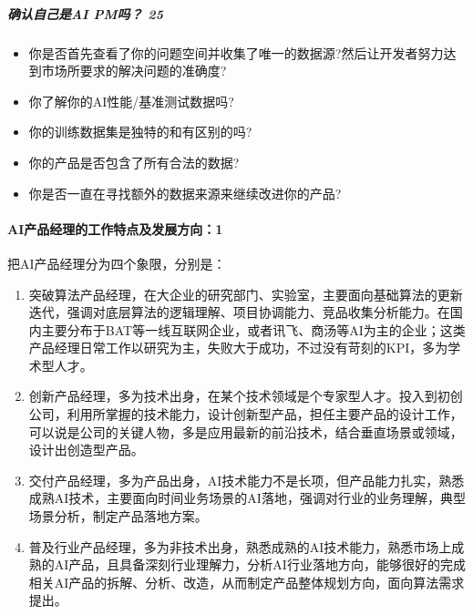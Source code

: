\documentclass[letterpaper,11pt,english]{sphinxmanual}
\begin{document}
\subparagraph{确认自己是AI PM吗？ 25\sphinxfootnotemark[82]}
\label{\detokenize{chapter_introduction/AI_PM:ai-pm-25}}%
\begin{footnotetext}[82]\sphinxAtStartFootnote
{}
%
\end{footnotetext}\ignorespaces \begin{itemize}
\item {} 
你是否首先查看了你的问题空间并收集了唯一的数据源?然后让开发者努力达到市场所要求的解决问题的准确度?

\item {} 
你了解你的AI性能/基准测试数据吗?

\item {} 
你的训练数据集是独特的和有区别的吗?

\item {} 
你的产品是否包含了所有合法的数据?

\item {} 
你是否一直在寻找额外的数据来源来继续改进你的产品?

\end{itemize}


\paragraph{AI产品经理的工作特点及发展方向：1\sphinxfootnotemark[83]}
\label{\detokenize{chapter_introduction/AI_PM:ai-1}}%
\begin{footnotetext}[83]\sphinxAtStartFootnote
{}
%
\end{footnotetext}\ignorespaces 
把AI产品经理分为四个象限，分别是：
\begin{enumerate}
%
\item {} 
突破算法产品经理，在大企业的研究部门、实验室，主要面向基础算法的更新迭代，强调对底层算法的逻辑理解、项目协调能力、竞品收集分析能力。在国内主要分布于BAT等一线互联网企业，或者讯飞、商汤等AI为主的企业；这类产品经理日常工作以研究为主，失败大于成功，不过没有苛刻的KPI，多为学术型人才。

\item {} 
创新产品经理，多为技术出身，在某个技术领域是个专家型人才。投入到初创公司，利用所掌握的技术能力，设计创新型产品，担任主要产品的设计工作，可以说是公司的关键人物，多是应用最新的前沿技术，结合垂直场景或领域，设计出创造型产品。

\item {} 
交付产品经理，多为产品出身，AI技术能力不是长项，但产品能力扎实，熟悉成熟AI技术，主要面向时间业务场景的AI落地，强调对行业的业务理解，典型场景分析，制定产品落地方案。

\item {} 
普及行业产品经理，多为非技术出身，熟悉成熟的AI技术能力，熟悉市场上成熟的AI产品，且具备深刻行业理解力，分析AI行业落地方向，能够很好的完成相关AI产品的拆解、分析、改造，从而制定产品整体规划方向，面向算法需求提出。

\end{enumerate}
\end{document}
